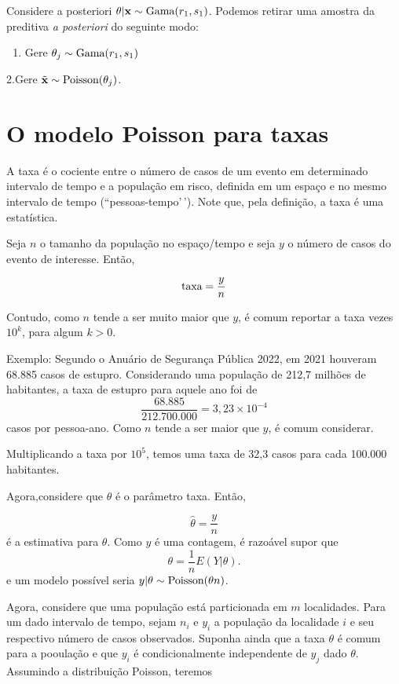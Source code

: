 \documentclass[
  letterpaper,
  DIV=11,
  numbers=noendperiod]{scrreprt}
\providecommand{\tightlist}{%
  \setlength{\itemsep}{0pt}\setlength{\parskip}{0pt}}\usepackage{longtable,booktabs,array}
\theoremstyle{definition}
\theoremstyle{definition}
\theoremstyle{remark}
\begin{document}
Considere a posteriori \(\theta|\mathbf{x}\sim\hbox{Gama}(r_1,s_1)\).
Podemos retirar uma amostra da preditiva \textit{a posteriori} do
seguinte modo:

\begin{enumerate}
\def\labelenumi{\arabic{enumi}.}
\tightlist
\item
  Gere \(\theta_j\sim\hbox{Gama}(r_1,s_1)\)
\end{enumerate}

2.Gere \(\tilde{\mathbf{x}}\sim\hbox{Poisson}(\theta_j)\).

\hypertarget{o-modelo-poisson-para-taxas}{%
\section{O modelo Poisson para
taxas}\label{o-modelo-poisson-para-taxas}}

A taxa é o cociente entre o número de casos de um evento em determinado
intervalo de tempo e a população em risco, definida em um espaço e no
mesmo intervalo de tempo (``pessoas-tempo'\,'). Note que, pela
definição, a taxa é uma estatística.

Seja \(n\) o tamanho da população no espaço/tempo e seja \(y\) o número
de casos do evento de interesse. Então,

\[\hbox{taxa} = \frac{y}{n}\]

Contudo, como \(n\) tende a ser muito maior que \(y\), é comum reportar
a taxa vezes \(10^k\), para algum \(k>0\).

Exemplo: Segundo o Anuário de Segurança Pública 2022, em 2021 houveram
68.885 casos de estupro. Considerando uma população de 212,7 milhões de
habitantes, a taxa de estupro para aquele ano foi de
\[\frac{68.885}{212.700.000}=3,23\times 10^{-4}\] casos por pessoa-ano.
Como \(n\) tende a ser maior que \(y\), é comum considerar.

Multiplicando a taxa por \(10^5\), temos uma taxa de 32,3 casos para
cada 100.000 habitantes.

Agora,considere que \(\theta\) é o parâmetro taxa. Então,

\[\hat{\theta}=\frac{y}{n}\] é a estimativa para \(\theta\). Como \(y\)
é uma contagem, é razoável supor que \[\theta =\frac{1}{n}E(Y|\theta).\]
e um modelo possível seria \(y|\theta\sim\hbox{Poisson}(\theta n)\).

Agora, considere que uma população está particionada em \(m\)
localidades. Para um dado intervalo de tempo, sejam \(n_i\) e \(y_i\) a
população da localidade \(i\) e seu respectivo número de casos
observados. Suponha ainda que a taxa \(\theta\) é comum para a pooulação
e que \(y_i\) é condicionalmente independente de \(y_j\) dado
\(\theta\). Assumindo a distribuição Poisson, teremos
\end{document}

